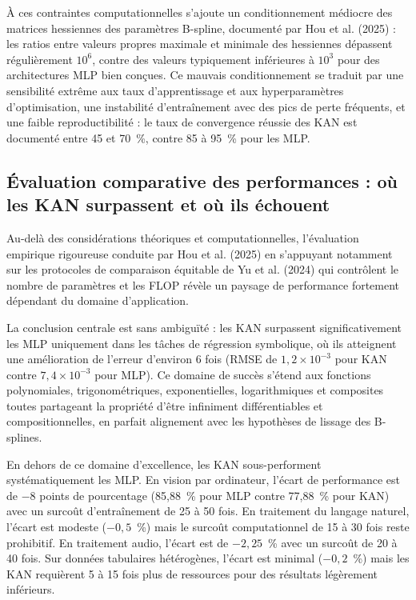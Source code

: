 \documentclass[11pt,a4paper,oneside]{report}
\theoremstyle{definition}
\theoremstyle{remark}
\begin{document}
À ces contraintes computationnelles s'ajoute un conditionnement médiocre des matrices hessiennes des paramètres B-spline, documenté par Hou et al. (2025) : les ratios entre valeurs propres maximale et minimale des hessiennes dépassent régulièrement $10^6$, contre des valeurs typiquement inférieures à $10^3$ pour des architectures MLP bien conçues. Ce mauvais conditionnement se traduit par une sensibilité extrême aux taux d'apprentissage et aux hyperparamètres d'optimisation, une instabilité d'entraînement avec des pics de perte fréquents, et une faible reproductibilité : le taux de convergence réussie des KAN est documenté entre 45 et 70~\%, contre 85 à 95~\% pour les MLP.

\subsection{Évaluation comparative des performances : où les KAN surpassent et où ils échouent}

Au-delà des considérations théoriques et computationnelles, l'évaluation empirique rigoureuse conduite par Hou et al. (2025)  en s'appuyant notamment sur les protocoles de comparaison équitable de Yu et al. (2024) qui contrôlent le nombre de paramètres et les FLOP  révèle un paysage de performance fortement dépendant du domaine d'application.

La conclusion centrale est sans ambiguïté : les KAN surpassent significativement les MLP uniquement dans les tâches de régression symbolique, où ils atteignent une amélioration de l'erreur d'environ 6 fois (RMSE de $1{,}2 \times 10^{-3}$ pour KAN contre $7{,}4 \times 10^{-3}$ pour MLP). Ce domaine de succès s'étend aux fonctions polynomiales, trigonométriques, exponentielles, logarithmiques et composites  toutes partageant la propriété d'être infiniment différentiables et compositionnelles, en parfait alignement avec les hypothèses de lissage des B-splines.

En dehors de ce domaine d'excellence, les KAN sous-performent systématiquement les MLP. En vision par ordinateur, l'écart de performance est de $-8$ points de pourcentage (85,88~\% pour MLP contre 77,88~\% pour KAN) avec un surcoût d'entraînement de 25 à 50 fois. En traitement du langage naturel, l'écart est modeste ($-0{,}5$~\%) mais le surcoût computationnel de 15 à 30 fois reste prohibitif. En traitement audio, l'écart est de $-2{,}25$~\% avec un surcoût de 20 à 40 fois. Sur données tabulaires hétérogènes, l'écart est minimal ($-0{,}2$~\%) mais les KAN requièrent 5 à 15 fois plus de ressources pour des résultats légèrement inférieurs.
\end{document}
